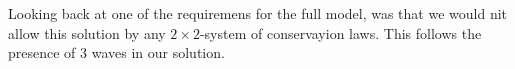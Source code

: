 \documentclass[10pt]{article}
\numberwithin{equation}{section}
\begin{document}
Looking back at one of the requiremens for the full model, was that we would nit allow this solution by any $2 \times 2$-system of conservayion laws. This follows the presence of $3$ waves in our solution. 

\end{document}
